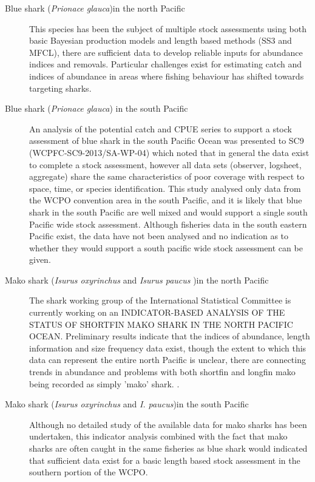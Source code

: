 \documentclass[12pt]{SCreport}
\begin{document}
\begin{description}
  \item[Blue shark (\emph{Prionace glauca})in the north Pacific] This species has been the subject of multiple stock assessments using both basic Bayesian production models and length based methods (SS3 and MFCL), there are sufficient data to develop reliable inputs for abundance indices and removals. Particular challenges exist for estimating catch and indices of abundance in areas where fishing behaviour has shifted towards targeting sharks. 
  
\item[Blue shark (\emph{Prionace glauca}) in the south Pacific]
An analysis of the potential catch and CPUE series to support a stock assessment of blue shark in the south Pacific Ocean was presented to SC9 (WCPFC-SC9-2013/SA-WP-04) which noted that in general the data exist to complete a stock assessment, however all data sets (observer, logsheet, aggregate) share the same characteristics of poor coverage with respect to space, time, or species identification. This study analysed only data from the WCPO convention area in the south Pacific, and it is likely that blue shark in the south Pacific are well mixed and would support a single south Pacific wide stock assessment. Although fisheries data in the south eastern Pacific exist, the data have not been analysed and no indication as to whether they would support a south pacific wide stock assessment can be given.

\item[Mako shark (\emph{Isurus oxyrinchus} and \emph{Isurus paucus} )in the north Pacific] The shark working group of the International Statistical Committee is currently working on an INDICATOR-BASED ANALYSIS OF THE STATUS OF SHORTFIN MAKO SHARK IN THE NORTH PACIFIC OCEAN. Preliminary results indicate that the indices of abundance, length information and size frequency data exist, though the extent to which this data can represent the entire north Pacific is unclear, there are connecting trends in abundance and problems with both shortfin and longfin mako being recorded as simply 'mako' shark. .

\item[Mako shark (\emph{Isurus oxyrinchus} and \emph{I. paucus})in the south Pacific] Although no detailed study of the available data for mako sharks has been undertaken, this indicator analysis combined with the fact that mako sharks are often caught in the same fisheries as blue shark would indicated that sufficient data exist for a basic length based stock assessment in the southern portion of the WCPO.


\end{description}
\end{document}
